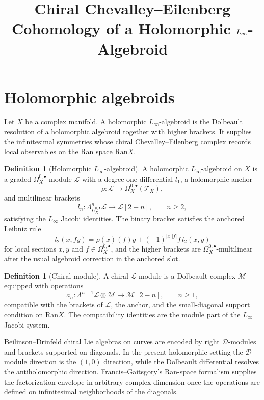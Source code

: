 \documentclass[11pt]{amsart}
\title{Chiral Chevalley--Eilenberg Cohomology of a Holomorphic
$\Linf$-Algebroid}
\date{}
\providecommand{\Ran}{\mathrm{Ran}}
\providecommand{\cL}{\mathcal{L}}
\providecommand{\cM}{\mathcal{M}}
\providecommand{\cD}{\mathcal{D}}
\providecommand{\cT}{\mathcal{T}}
\providecommand{\Linf}{L_\infty}
\theoremstyle{plain}
\theoremstyle{definition}
\newtheorem{definition}[theorem]{Definition}
\theoremstyle{remark}
\begin{document}
\maketitle

\section{Holomorphic algebroids}

Let $X$ be a complex manifold. A holomorphic $\Linf$-algebroid is the
Dolbeault resolution of a holomorphic algebroid together with higher
brackets. It supplies the infinitesimal symmetries whose chiral
Chevalley--Eilenberg complex records local observables on the Ran space
$\Ran X$.

\begin{definition}[Holomorphic $\Linf$-algebroid]\label{def:hol-linf-algebroid}
A holomorphic $\Linf$-algebroid on $X$ is a graded
$\Omega_X^{0,\bullet}$-module $\cL$ with a degree-one differential
$l_1$, a holomorphic anchor
\[
  \rho \colon \cL \longrightarrow \Omega_X^{0,\bullet}(\cT_X),
\]
and multilinear brackets
\[
  l_n \colon \Lambda^n_{\Omega_X^{0,\bullet}}\cL
  \longrightarrow \cL[2-n],
  \qquad n\geq 2,
\]
satisfying the $\Linf$ Jacobi identities. The binary bracket satisfies
the anchored Leibniz rule
\[
  l_2(x, f y)
  =
  \rho(x)(f)y + (-1)^{|x||f|}f\,l_2(x,y)
\]
for local sections $x,y$ and $f\in\Omega_X^{0,\bullet}$, and the higher
brackets are $\Omega_X^{0,\bullet}$-multilinear after the usual
algebroid correction in the anchored slot.
\end{definition}

\begin{definition}[Chiral module]\label{def:chiral-module}
A chiral $\cL$-module is a Dolbeault complex $\cM$ equipped with
operations
\[
  a_n \colon \Lambda^{n-1}\cL\otimes\cM\longrightarrow \cM[2-n],
  \qquad n\geq 1,
\]
compatible with the brackets of $\cL$, the anchor, and the small-diagonal
support condition on $\Ran X$. The compatibility identities are the
module part of the $\Linf$ Jacobi system.
\end{definition}

Beilinson--Drinfeld chiral Lie algebras on curves are encoded by
right $\cD$-modules and brackets supported on diagonals. In the present
holomorphic setting the $\cD$-module direction is the $(1,0)$ direction,
while the Dolbeault differential resolves the antiholomorphic direction.
Francis--Gaitsgory's Ran-space formalism supplies the factorization
envelope in arbitrary complex dimension once the operations are defined
on infinitesimal neighborhoods of the diagonals.
\end{document}
